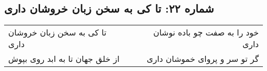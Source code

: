 \begin{center}
\section*{شماره ۲۲: تا کی به سخن زبان خروشان داری}
\label{sec:022}
\begin{longtable}{l p{0.5cm} r}
تا کی به سخن زبان خروشان داری
&&
خود را به صفت چو باده نوشان داری
\\
از خلق جهان تا به ابد روی بپوش
&&
گر تو سر و پروای خموشان داری
\\
\end{longtable}
\end{center}
